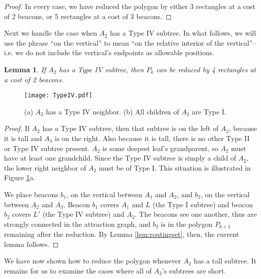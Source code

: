 \documentclass{article}
\newtheorem{lemma}{Lemma}
\begin{document}
\begin{proof}
			In every case, we have reduced the polygon by either 3 rectangles at a cost
			of 2 beacons, or 5 rectangles at a cost of 3 beacons.
			
		\end{proof} 
		
		Next we handle the case when $A_2$ has a Type IV subtree.  In what follows,
		we will use the phrase ``on the vertical'' to mean ``on the relative interior
		of the vertical''--i.e. we do not include the vertical's endpoints as
		allowable positions.
		
		\begin{lemma}\label{lem:typeIV}
			If $A_2$ has a Type IV subtree, then $P_k$ can be reduced by 4 
			rectangles at a cost of 2 beacons.
		\end{lemma}
				
		\begin{figure}[htbp] 
			\begin{center}
				\texttt{[image: TypeIV.pdf]} 
			\end{center}
			\caption{ (a) $A_2$ has a Type IV neighbor. 
					  (b) All children of $A_2$ are Type I.}
			\label{fig:typefour}
		\end{figure}
		
		\begin{proof}
			If $A_2$ has a Type IV subtree, then that subtree is on the left of $A_2$,
			because it is tall and $A_3$ is on the right.  Also because it is tall, there
			is no other Type II or Type IV subtree present.
			$A_2$ is some deepest leaf's grandparent, so $A_2$ must have at least one
			grandchild. Since the Type IV subtree is simply a child of $A_2$, the
			lower right neighbor of $A_2$ must be of Type I.
			This situation is illustrated in Figure \ref{fig:typefour}a.
			
			We place beacons $b_1$, on the vertical between
			$A_1$ and $A_2$, and $b_2$, on the vertical between $A_2$ and $A_3$.
			Beacon $b_1$ covers $A_1$ and $L$ (the Type I subtree)
			and beacon $b_2$ covers $L'$ (the Type IV subtree) and $A_2$.
			The beacons see one another, thus are strongly connected in the attraction
			graph, and $b_2$ is in the polygon $P_{k+1}$ remaining after the reduction.
			By Lemma \ref{lem:routingset}, then, the
			current lemma follows.
		\end{proof}
		
		We have now shown how to reduce the polygon whenever $A_2$ has a tall subtree.
		It remains for us to examine the cases where all of $A_2$'s subtrees are
		short.
		
\end{document}
